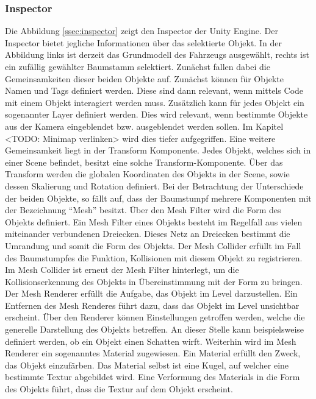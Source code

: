 \subsubsection{Inspector}
Die Abbildung \ref{ssec:inspector} zeigt den Inspector der Unity Engine. Der Inspector bietet jegliche Informationen über das selektierte Objekt. In der Abbildung links ist derzeit das Grundmodell des Fahrzeugs ausgewählt, rechts ist ein zufällig gewählter Baumstamm selektiert.
Zunächst fallen dabei die Gemeinsamkeiten dieser beiden Objekte auf. Zunächst können für Objekte Namen und Tags definiert werden. Diese sind dann relevant, wenn mittels Code mit einem Objekt interagiert werden muss. Zusätzlich kann für jedes Objekt ein sogenannter Layer definiert werden. Dies wird relevant, wenn bestimmte Objekte aus der Kamera eingeblendet bzw. ausgeblendet werden sollen. Im Kapitel <TODO: Minimap verlinken> wird dies tiefer aufgegriffen. Eine weitere Gemeinsamkeit liegt in der Transform Komponente. Jedes Objekt, welches sich in einer Scene befindet, besitzt eine solche Transform-Komponente. Über das Transform werden die globalen Koordinaten des Objekts in der Scene, sowie dessen Skalierung und Rotation definiert.
Bei der Betrachtung der Unterschiede der beiden Objekte, so fällt auf, dass der Baumstumpf mehrere Komponenten mit der Bezeichnung \enquote{Mesh} besitzt.
Über den Mesh Filter wird die Form des Objekts definiert. Ein Mesh Filter eines Objekts besteht im Regelfall aus vielen miteinander verbundenen Dreiecken. Dieses Netz an Dreiecken bestimmt die Umrandung und somit die Form des Objekts.
Der Mesh Collider erfüllt im Fall des Baumstumpfes die Funktion, Kollisionen mit diesem Objekt zu registrieren. Im Mesh Collider ist erneut der Mesh Filter hinterlegt, um die Kollisionserkennung des Objekts in Übereinstimmung mit der Form zu bringen.
Der Mesh Renderer erfüllt die Aufgabe, das Objekt im Level darzustellen. Ein Entfernen des Mesh Renderes führt dazu, dass das Objekt im Level unsichtbar erscheint. Über den Renderer können Einstellungen getroffen werden, welche die generelle Darstellung des Objekts betreffen. An dieser Stelle kann beispielsweise definiert werden, ob ein Objekt einen Schatten wirft. Weiterhin wird im Mesh Renderer ein sogenanntes Material zugewiesen. Ein Material erfüllt den Zweck, das Objekt einzufärben. Das Material selbst ist eine Kugel, auf welcher eine bestimmte Textur abgebildet wird. Eine Verformung des Materials in die Form des Objekts führt, dass die Textur auf dem Objekt erscheint.

